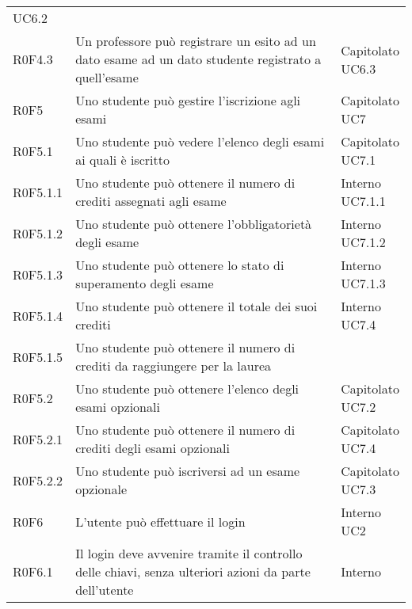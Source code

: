 \documentclass[AnalisiDeiRequisiti.tex]{subfiles}
\begin{document}
\begin{longtable}[H]{p{2cm}p{5.2cm}p{5cm}}
{		UC6.2
	} \\  
	R0F4.3 &  Un professore può registrare un esito ad un dato esame ad un dato studente registrato a quell'esame & \makecell[tl]{
		Capitolato \\ 
		UC6.3
	} \\  
	R0F5 &  Uno studente può gestire l'iscrizione agli esami & \makecell[tl]{
		Capitolato \\ 
		UC7
	} \\  
	R0F5.1 &  Uno studente può vedere l'elenco degli esami ai quali è iscritto & \makecell[tl]{
		Capitolato \\ 
		UC7.1
	} \\  
	R0F5.1.1 &  Uno studente può ottenere il numero di crediti assegnati agli esame & \makecell[tl]{
		Interno \\ 
		UC7.1.1
	} \\  
	R0F5.1.2 &  Uno studente può ottenere l'obbligatorietà degli esame & \makecell[tl]{
		Interno \\ 
		UC7.1.2
	} \\  
	R0F5.1.3 &  Uno studente può ottenere lo stato di superamento degli esame & \makecell[tl]{
		Interno \\ 
		UC7.1.3
	} \\  
	R0F5.1.4 &  Uno studente può ottenere il totale dei suoi crediti & \makecell[tl]{
		Interno \\ 
		UC7.4
	} \\  
	R0F5.1.5 &  Uno studente può ottenere il numero di crediti da raggiungere per la laurea & \makecell[tl]{
		Interno
	} \\  
	R0F5.2 &  Uno studente può ottenere l'elenco degli esami opzionali & \makecell[tl]{
		Capitolato \\ 
		UC7.2
	} \\  
	R0F5.2.1 &  Uno studente può ottenere il numero di crediti degli esami opzionali & \makecell[tl]{
		Capitolato \\ 
		UC7.4
	} \\  
	R0F5.2.2 &  Uno studente può iscriversi ad un esame opzionale & \makecell[tl]{
		Capitolato \\ 
		UC7.3
	} \\  
	R0F6 &  L'utente può effettuare il login & \makecell[tl]{
		Interno \\ 
		UC2
	} \\  
	R0F6.1 &  Il login deve avvenire tramite il controllo delle chiavi, senza ulteriori azioni da parte dell'utente & \makecell[tl]{
		Interno \\ 
}
\end{longtable}
\end{document}
